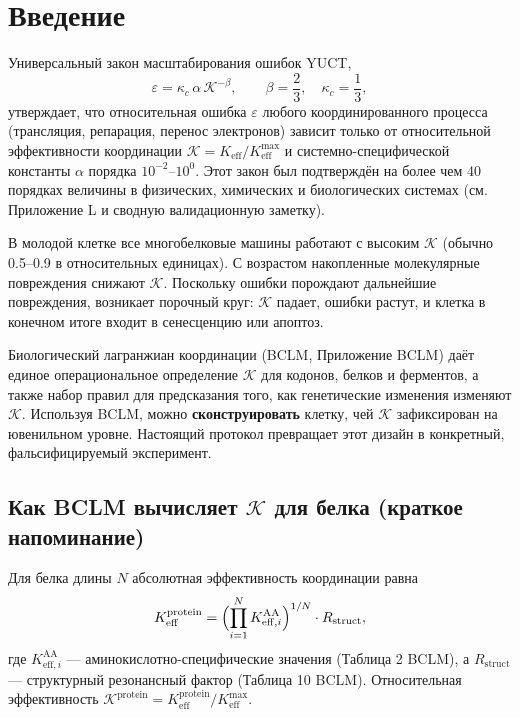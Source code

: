 \documentclass[12pt,a4paper]{article}
\newcommand{\REL}{\mathcal{K}}          %
\begin{document}
	\tableofcontents
	\newpage
	
	\section{Введение}
	\label{sec:intro}
	Универсальный закон масштабирования ошибок YUCT,
	\begin{equation}
		\varepsilon = \kappa_c \, \alpha \, \REL^{-\beta}, \qquad \beta = \frac{2}{3},\quad \kappa_c = \frac{1}{3},
		\label{eq:error-law}
	\end{equation}
	утверждает, что относительная ошибка \(\varepsilon\) любого координированного процесса (трансляция, репарация, перенос электронов) зависит только от относительной эффективности координации \(\REL = K_{\mathrm{eff}}/K_{\mathrm{eff}}^{\max}\) и системно-специфической константы \(\alpha\) порядка \(10^{-2}\)–\(10^{0}\). Этот закон был подтверждён на более чем 40 порядках величины в физических, химических и биологических системах (см. Приложение L и сводную валидационную заметку).
	
	В молодой клетке все многобелковые машины работают с высоким \(\REL\) (обычно 0.5–0.9 в относительных единицах). С возрастом накопленные молекулярные повреждения снижают \(\REL\). Поскольку ошибки порождают дальнейшие повреждения, возникает порочный круг: \(\REL\) падает, ошибки растут, и клетка в конечном итоге входит в сенесценцию или апоптоз.
	
	Биологический лагранжиан координации (BCLM, Приложение BCLM) даёт единое операциональное определение \(\REL\) для кодонов, белков и ферментов, а также набор правил для предсказания того, как генетические изменения изменяют \(\REL\). Используя BCLM, можно \textbf{сконструировать} клетку, чей \(\REL\) зафиксирован на ювенильном уровне. Настоящий протокол превращает этот дизайн в конкретный, фальсифицируемый эксперимент.
	
	\subsection{Как BCLM вычисляет \(\REL\) для белка (краткое напоминание)}
	Для белка длины \(N\) абсолютная эффективность координации равна
	\[
	K_{\mathrm{eff}}^{\mathrm{protein}} = \Bigl( \prod_{i=1}^{N} K_{\mathrm{eff},i}^{\mathrm{AA}} \Bigr)^{1/N} \cdot R_{\mathrm{struct}},
	\]
	где \(K_{\mathrm{eff},i}^{\mathrm{AA}}\) — аминокислотно-специфические значения (Таблица 2 BCLM), а \(R_{\mathrm{struct}}\) — структурный резонансный фактор (Таблица 10 BCLM). Относительная эффективность \(\REL^{\mathrm{protein}} = K_{\mathrm{eff}}^{\mathrm{protein}}/K_{\mathrm{eff}}^{\max}\).
	
\end{document}
